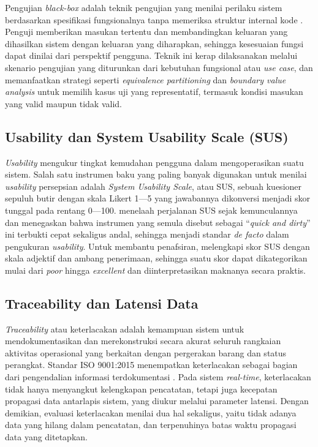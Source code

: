 Pengujian \textit{black-box} adalah teknik pengujian yang menilai perilaku sistem berdasarkan spesifikasi fungsionalnya tanpa memeriksa struktur internal kode \autocite{nidhra2012}. Penguji memberikan masukan tertentu dan membandingkan keluaran yang dihasilkan sistem dengan keluaran yang diharapkan, sehingga kesesuaian fungsi dapat dinilai dari perspektif pengguna. Teknik ini kerap dilaksanakan melalui skenario pengujian yang diturunkan dari kebutuhan fungsional atau \textit{use case}, dan memanfaatkan strategi seperti \textit{equivalence partitioning} dan \textit{boundary value analysis} untuk memilih kasus uji yang representatif, termasuk kondisi masukan yang valid maupun tidak valid.

\subsection{Usability dan System Usability Scale (SUS)}

\textit{Usability} mengukur tingkat kemudahan pengguna dalam mengoperasikan suatu sistem. Salah satu instrumen baku yang paling banyak digunakan untuk menilai \textit{usability} persepsian adalah \textit{System Usability Scale}, atau SUS, sebuah kuesioner sepuluh butir dengan skala Likert 1---5 yang jawabannya dikonversi menjadi skor tunggal pada rentang 0---100. \textcite{lewis2018} menelaah perjalanan SUS sejak kemunculannya dan menegaskan bahwa instrumen yang semula disebut sebagai ``\textit{quick and dirty}'' ini terbukti cepat sekaligus andal, sehingga menjadi standar \textit{de facto} dalam pengukuran \textit{usability}. Untuk membantu penafsiran, \textcite{bangor2009} melengkapi skor SUS dengan skala adjektif dan ambang penerimaan, sehingga suatu skor dapat dikategorikan mulai dari \textit{poor} hingga \textit{excellent} dan diinterpretasikan maknanya secara praktis.

\subsection{Traceability dan Latensi Data}

\textit{Traceability} atau keterlacakan adalah kemampuan sistem untuk mendokumentasikan dan merekonstruksi secara akurat seluruh rangkaian aktivitas operasional yang berkaitan dengan pergerakan barang dan status perangkat. Standar ISO 9001:2015 menempatkan keterlacakan sebagai bagian dari pengendalian informasi terdokumentasi \autocite{iso9001}. Pada sistem \textit{real-time}, keterlacakan tidak hanya menyangkut kelengkapan pencatatan, tetapi juga kecepatan propagasi data antarlapis sistem, yang diukur melalui parameter latensi. Dengan demikian, evaluasi keterlacakan menilai dua hal sekaligus, yaitu tidak adanya data yang hilang dalam pencatatan, dan terpenuhinya batas waktu propagasi data yang ditetapkan.

